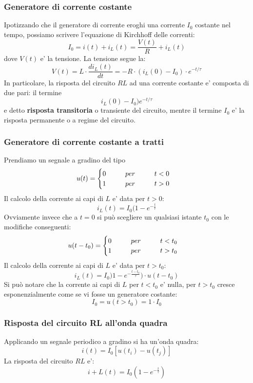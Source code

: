 \documentclass[a4paper, 10pt]{article}
\begin{document}
			\subsubsection{Generatore di corrente costante}
				Ipotizzando che il generatore di corrente eroghi una corrente $I_0$ costante nel tempo, possiamo scrivere 
				l'equazione di Kirchhoff delle correnti:
				\[ I_0 = i(t) + i_L(t) = \frac{V(t)}{R} + i_L (t) \] dove $V(t)$ e' la tensione. La tensione segue la:
				\[ V(t) = L \cdot \frac{di_L (t)}{dt} = -R \cdot (i_L (0) - I_0) \cdot e^{-t/ \tau}  \]
				In particolare, la risposta del circuito $RL$ ad una corrente costante e' composta di due pari: il termine
				\[ i_L (0) - I_0) e^{-t/\tau} \] e detto \textbf{risposta transitoria} o transiente del circuito, mentre il
				termine $I_0$ e' la risposta permanente o a regime del circuito.
			\subsubsection{Generatore di corrente costante a tratti}
				Prendiamo un segnale a gradino del tipo
				\[ u(t) = \begin{cases} 0 \hspace{1.0cm} per \hspace{1.0cm} t < 0 \\ 1  \hspace{1.0cm} per \hspace{1.0cm}t > 0 
				\end{cases} \]
				Il calcolo della corrente ai capi di $L$ e' data per $t > 0$:
				\[ i_L (t) = I_0 ( 1 - e^{- \frac{t}{\tau}} \]
				Ovviamente invece che a $t = 0$ si può scegliere un qualsiasi istante $t_0$ con le modifiche conseguenti:
				\[ u(t - t_0) = \begin{cases} 0  \hspace{1.0cm} per \hspace{1.0cm} t < t_0 \\ 1  
				\hspace{1.0cm} per \hspace{1.0cm}t > t_0 \end{cases} \]
				Il calcolo della corrente ai capi di $L$ e' data per $t > t_0$:
				\[ i_L(t) = I_0 ) 1 - e^{-\frac{t - t_0}{\tau}} ) \cdot u(t - t_0) \]
				Si può notare che la corrente ai capi di $L$ per $t < t_0$ e' nulla, per $t > t_0$ cresce 
				esponenzialmente come se vi fosse un generatore costante:
				\[ I_0 = u(t > t_0) = 1 \cdot I_0 \]
			\subsubsection{Risposta del circuito RL all'onda quadra}
				Applicando un segnale periodico a gradino si ha un'onda quadra:
				\[ i(t) = I_0[u(t_i) - u(t_j)] \]
				La risposta del circuito $RL$ e':
				\[ i+L(t) = I_0 (1- e^{-\frac{t}{\tau}}) \]
\end{document}
